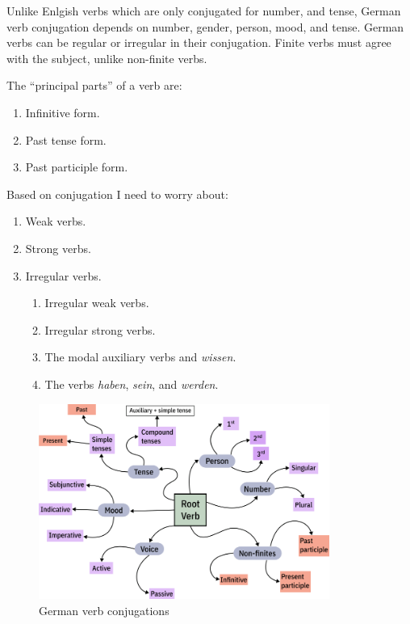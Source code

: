 \documentclass[a4paper]{article}
\begin{document}
Unlike Enlgish verbs which are only conjugated for number, and tense, German verb conjugation depends on number, gender, 
person, mood, and tense. German verbs can be regular or irregular in their conjugation. Finite verbs must agree with
the subject, unlike non-finite verbs.

The ``principal parts'' of a verb are:
\begin{enumerate}
    \item Infinitive form.
    \item Past tense form.
    \item Past participle form.
\end{enumerate}

Based on conjugation I need to worry about:

\begin{enumerate}
    \item Weak verbs.
    \item Strong verbs.
    \item Irregular verbs.
          \begin{enumerate}
              \item Irregular weak verbs.
              \item Irregular strong verbs.
              \item The modal auxiliary verbs and \emph{wissen}.
              \item The verbs \emph{haben}, \emph{sein}, and \emph{werden}.
          \end{enumerate}
\end{enumerate}

\begin{figure}
    \centering
    \includegraphics[width=0.85\textwidth]{graphics/german-verb-conjugation.png}
    \caption{German verb conjugations}
\end{figure}
\end{document}
